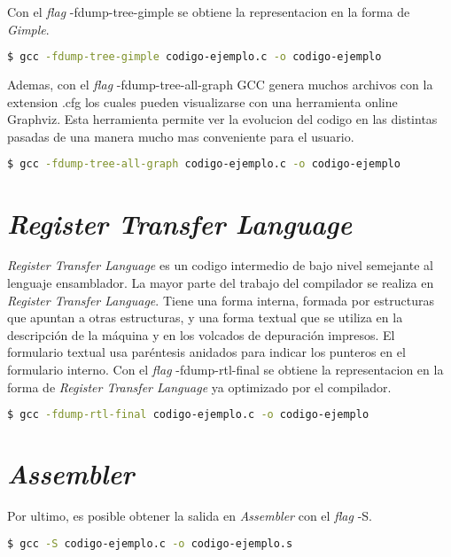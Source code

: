 Con el \emph{flag} -fdump-tree-gimple se obtiene la representacion en la forma de \emph{Gimple}.

\begin{lstlisting}[label=comandoC, caption= Comando de compilación para obtener codigo-ejemplo.c.006t.gimple \cite{repositorio} para GCC., language=bash]
    $ gcc -fdump-tree-gimple codigo-ejemplo.c -o codigo-ejemplo  \end{lstlisting}

Ademas, con el \emph{flag} -fdump-tree-all-graph GCC genera muchos archivos con la extension .cfg 
los cuales pueden visualizarse con una herramienta online Graphviz. Esta herramienta permite 
ver la evolucion del codigo en las distintas pasadas de una manera mucho mas conveniente 
para el usuario. 

\begin{lstlisting}[label=comandoC, caption= Comando de compilación del archivo codigo-ejemplo.c \cite{repositorio} para GCC., language=bash]
    $ gcc -fdump-tree-all-graph codigo-ejemplo.c -o codigo-ejemplo  \end{lstlisting}


\section{\emph{Register Transfer Language}}

\emph{Register Transfer Language} es un codigo intermedio de bajo nivel semejante al lenguaje ensamblador.
La mayor parte del trabajo del compilador se realiza en \emph{Register Transfer Language}. Tiene una forma interna, 
formada por estructuras que apuntan a otras estructuras, y una forma textual 
que se utiliza en la descripción de la máquina y en los volcados de depuración 
impresos. El formulario textual usa paréntesis anidados para indicar los punteros en el formulario interno.
Con el \emph{flag} -fdump-rtl-final se obtiene la representacion en la forma de \emph{Register Transfer Language} ya optimizado por el compilador.

\begin{lstlisting}[label=comandoC, caption= Comando de compilación para obtener codigo-ejemplo.c.330r.final \cite{repositorio} para GCC., language=bash]
    $ gcc -fdump-rtl-final codigo-ejemplo.c -o codigo-ejemplo  \end{lstlisting}

\section{\emph{Assembler}}
Por ultimo, es posible obtener la salida en \emph{Assembler} con el \emph{flag} -S.

\begin{lstlisting}[label=comandoC, caption= Comando de compilación para obtener codigo-ejemplo.s \cite{repositorio} para GCC., language=bash]
    $ gcc -S codigo-ejemplo.c -o codigo-ejemplo.s  \end{lstlisting}


